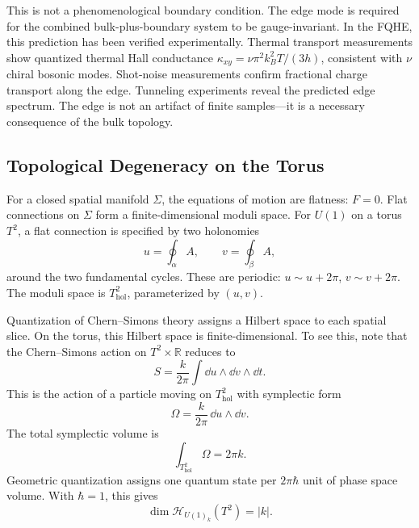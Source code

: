 This is not a phenomenological boundary condition. The edge mode is required for the combined bulk-plus-boundary system to be gauge-invariant. In the FQHE, this prediction has been verified experimentally. Thermal transport measurements show quantized thermal Hall conductance $\kappa_{xy}=\nu\pi^2 k_B^2 T/(3h)$, consistent with $\nu$ chiral bosonic modes. Shot-noise measurements confirm fractional charge transport along the edge. Tunneling experiments reveal the predicted edge spectrum. The edge is not an artifact of finite samples---it is a necessary consequence of the bulk topology.

\subsection{Topological Degeneracy on the Torus}
\label{subsec:fqhe-torus}

For a closed spatial manifold $\Sigma$, the equations of motion are flatness: $F=0$. Flat connections on $\Sigma$ form a finite-dimensional moduli space. For $U(1)$ on a torus $T^2$, a flat connection is specified by two holonomies
\begin{equation}
  u = \oint_\alpha A,
  \qquad
  v = \oint_\beta A,
  \label{eq:fqhe-holonomies}
\end{equation}
around the two fundamental cycles. These are periodic: $u\sim u+2\pi$, $v\sim v+2\pi$. The moduli space is $T^2_{\mathrm{hol}}$, parameterized by $(u,v)$.

Quantization of Chern--Simons theory assigns a Hilbert space to each spatial slice. On the torus, this Hilbert space is finite-dimensional. To see this, note that the Chern--Simons action on $T^2\times\mathbb{R}$ reduces to
\begin{equation}
  S = \frac{k}{2\pi}\int \dd u\wedge \dd v\wedge \dd t.
  \label{eq:fqhe-reduced-action}
\end{equation}
This is the action of a particle moving on $T^2_{\mathrm{hol}}$ with symplectic form
\begin{equation}
  \Omega = \frac{k}{2\pi}\,\dd u\wedge\dd v.
  \label{eq:fqhe-symplectic-form}
\end{equation}
The total symplectic volume is
\begin{equation}
  \int_{T^2_{\mathrm{hol}}}\Omega = 2\pi k.
  \label{eq:fqhe-symplectic-volume}
\end{equation}
Geometric quantization assigns one quantum state per $2\pi\hbar$ unit of phase space volume. With $\hbar=1$, this gives
\begin{equation}
  \dim\mathcal{H}_{U(1)_k}(T^2) = |k|.
  \label{eq:fqhe-torus-degeneracy}
\end{equation}

